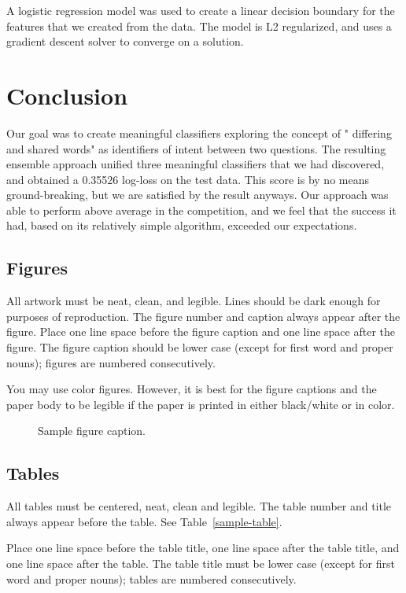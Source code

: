 \documentclass{article}
\begin{document}
A logistic regression model was used to create a linear decision boundary for
the features that we created from the data. The model is L2 regularized, and
uses a gradient descent solver to converge on a solution.

\section{Conclusion}
\label{headings}

Our goal was to create meaningful classifiers exploring the concept of "
differing and shared words" as identifiers of intent between two questions. The
resulting ensemble approach unified three meaningful classifiers that we had
discovered, and obtained a 0.35526 log-loss on the test data. This score is by
no means ground-breaking, but we are satisfied by the result anyways. Our
approach was able to perform above average in the competition, and we feel that
the success it had, based on its relatively simple algorithm, exceeded our
expectations.

\subsection{Figures}

All artwork must be neat, clean, and legible. Lines should be dark
enough for purposes of reproduction. The figure number and caption
always appear after the figure. Place one line space before the figure
caption and one line space after the figure. The figure caption should
be lower case (except for first word and proper nouns); figures are
numbered consecutively.

You may use color figures.  However, it is best for the figure
captions and the paper body to be legible if the paper is printed in
either black/white or in color.
\begin{figure}[h]
    \centering
    \fbox{\rule[-.5cm]{0cm}{4cm} \rule[-.5cm]{4cm}{0cm}}
    \caption{Sample figure caption.}
\end{figure}

\subsection{Tables}

All tables must be centered, neat, clean and legible.  The table
number and title always appear before the table.  See
Table~\ref{sample-table}.

Place one line space before the table title, one line space after the
table title, and one line space after the table. The table title must
be lower case (except for first word and proper nouns); tables are
numbered consecutively.
\end{document}
